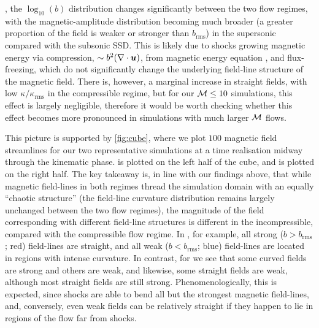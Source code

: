 {}, the $\log_{10}(b)$ distribution changes significantly between the two flow regimes, with the magnetic-amplitude distribution becoming much broader (a greater proportion of the field is weaker or stronger than $b_\mathrm{rms}$) in the supersonic compared with the subsonic SSD. This is likely due to shocks growing magnetic energy via compression, $\sim b^2(\nabla\cdot\bm{u})$, from magnetic energy equation \citep{beattie2023bulk}, and flux-freezing, which do not significantly change the underlying field-line structure of the magnetic field. There is, however, a marginal increase in straight fields, with low $\kappa/\kappa_\mathrm{rms}$ in the compressible regime, but for our $\mathcal{M} \leq 10$ simulations, this effect is largely negligible, therefore it would be worth checking whether this effect becomes more pronounced in simulations with much larger $\mathcal{M}$ flows.

This picture is supported by \autoref{fig:cube}, where we plot $100$ magnetic field streamlines for our two representative simulations at a time realisation midway through the kinematic phase.  is plotted on the left half of the cube, and  is plotted on the right half. The key takeaway is, in line with our findings above, that while magnetic field-lines in both regimes thread the simulation domain with an equally ``chaotic structure'' (the field-line curvature distribution remains largely unchanged between the two flow regimes), the magnitude of the field corresponding with different field-line structures is different in the incompressible, compared with the compressible flow regime. In , for example, all strong ($b > b_\mathrm{rms}$; red) field-lines are straight, and all weak ($b < b_\mathrm{rms}$; blue) field-lines are located in regions with intense curvature. In contrast, for  we see that some curved fields are strong and others are weak, and likewise, some straight fields are weak, although most straight fields are still strong. Phenomenologically, this is expected, since shocks are able to bend all but the strongest magnetic field-lines, and, conversely, even weak fields can be relatively straight if they happen to lie in regions of the flow far from shocks.

